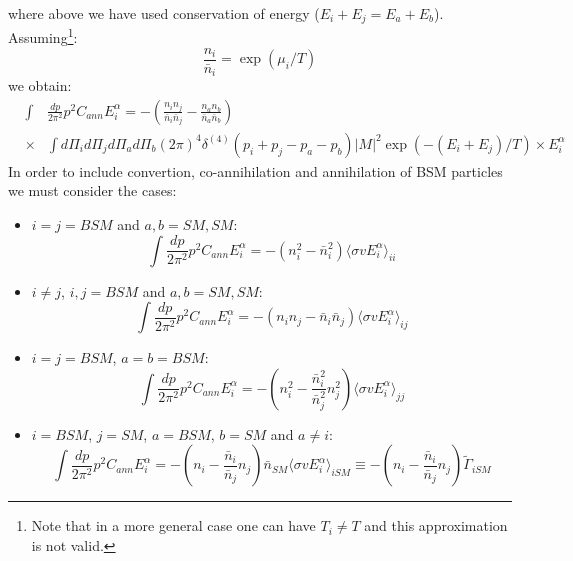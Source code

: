 \documentclass[preprint,notoc]{JHEP3}
\begin{document}
where above we have used conservation of energy ($E_i + E_j = E_a + E_b$). Assuming\footnote{Note that in a more
general case one can have $T_i \neq T$ and this approximation is not valid.}:
\begin{equation}
\frac{n_i}{\bar{n}_i} = \exp(\mu_i/T)
\end{equation}
we obtain:
\begin{eqnarray}
& \int & \frac{dp}{2 \pi^2} p^2 C_{ann} E_i^{\alpha} = -\left( \frac{n_i n_j}{\bar{n}_i \bar{n}_j} - \frac{n_a n_b}{\bar{n}_a \bar{n}_b}\right) \nonumber \\
 & \times & \int  d\Pi_{i} d\Pi_{j} d\Pi_{a} d\Pi_{b} (2 \pi)^4 \delta^{(4)}(p_i + p_j - p_a - p_b) |M|^2 \exp(-(E_i + E_j)/T) \times E_i^{\alpha} \nonumber
\end{eqnarray}
In order to include convertion, co-annihilation and annihilation of BSM particles we must consider the cases:
\begin{itemize}
	\item $i = j = BSM$ and $a,b = SM,SM$:
	\begin{equation}
		\int \frac{dp}{2 \pi^2} p^2 C_{ann} E_i^{\alpha}  =  -\left( n_i^2 - \bar{n}_i^2 \right) \langle \sigma v E_i^{\alpha} \rangle_{ii}
	\end{equation} 

	\item $i \neq j$, $i,j = BSM$ and $a,b = SM,SM$:
	\begin{equation}
		\int \frac{dp}{2 \pi^2} p^2 C_{ann} E_i^{\alpha}  =  -\left( n_i n_j - \bar{n}_i \bar{n}_j \right) \langle \sigma v E_i^{\alpha} \rangle_{ij}
	\end{equation} 

	\item $i =  j = BSM$, $ a = b = BSM$:
	\begin{equation}
		\int \frac{dp}{2 \pi^2} p^2 C_{ann} E_i^{\alpha}  =  -\left(n_i^2 - \frac{\bar{n}_i^2}{\bar{n}_j^2} n_j^2  \right) \langle \sigma v E_i^{\alpha} \rangle_{jj}
	\end{equation} 

	\item $i = BSM$, $j = SM$, $ a = BSM$, $b = SM$ and $a \neq i$:
	\begin{equation}
		\int \frac{dp}{2 \pi^2} p^2 C_{ann} E_i^{\alpha}  =  -\left(n_i - \frac{\bar{n}_i}{\bar{n}_j} n_j  \right) \bar{n}_{SM} \langle \sigma v E_i^{\alpha} \rangle_{iSM} \equiv  -\left(n_i - \frac{\bar{n}_i}{\bar{n}_j} n_j  \right) \tilde{\Gamma}_{iSM}
	\end{equation} 
	
\end{itemize}
\end{document}
